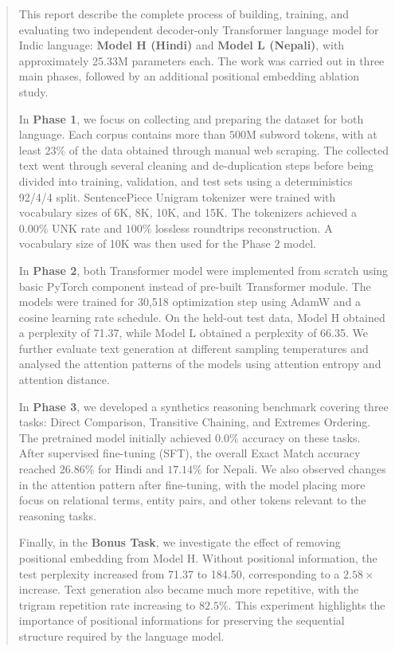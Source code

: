 \documentclass[10pt,a4paper]{article}
\begin{document}
\begin{abstract}
\footnotesize
This report describe the complete process of building, training, and evaluating
two independent decoder-only Transformer language model for Indic language:
\textbf{Model H (Hindi)} and \textbf{Model L (Nepali)}, with approximately
25.33M parameters each. The work was carried out in three main phases, followed
by an additional positional embedding ablation study.

In \textbf{Phase 1}, we focus on collecting and preparing the dataset for
both language. Each corpus contains more than $500\text{M}$ subword tokens,
with at least $23\%$ of the data obtained through manual web scraping. The
collected text went through several cleaning and de-duplication steps before
being divided into training, validation, and test sets using a deterministics
92/4/4 split. SentencePiece Unigram tokenizer were trained with vocabulary
sizes of 6K, 8K, 10K, and 15K. The tokenizers achieved a $0.00\%$ UNK rate and
$100\%$ lossless roundtrips reconstruction. A vocabulary size of 10K was then
used for the Phase 2 model.

In \textbf{Phase 2}, both Transformer model were implemented from scratch using
basic PyTorch component instead of pre-built Transformer module. The models
were trained for 30,518 optimization step using AdamW and a cosine learning
rate schedule. On the held-out test data, Model H obtained a perplexity of
71.37, while Model L obtained a perplexity of 66.35. We further evaluate
text generation at different sampling temperatures and analysed the attention
patterns of the models using attention entropy and attention distance.

In \textbf{Phase 3}, we developed a synthetics reasoning benchmark covering
three tasks: Direct Comparison, Transitive Chaining, and Extremes Ordering.
The pretrained model initially achieved $0.0\%$ accuracy on these tasks.
After supervised fine-tuning (SFT), the overall Exact Match accuracy reached
$26.86\%$ for Hindi and $17.14\%$ for Nepali. We also observed changes in the
attention pattern after fine-tuning, with the model placing more focus on
relational terms, entity pairs, and other tokens relevant to the reasoning
tasks.

Finally, in the \textbf{Bonus Task}, we investigate the effect of removing
positional embedding from Model H. Without positional information, the test
perplexity increased from 71.37 to 184.50, corresponding to a $2.58\times$
increase. Text generation also became much more repetitive, with the trigram
repetition rate increasing to $82.5\%$. This experiment highlights the
importance of positional informations for preserving the sequential structure
required by the language model.
\end{abstract}
\end{document}
